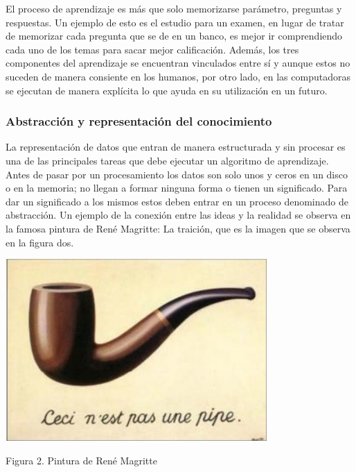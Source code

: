 \documentclass[
  letterpaper,
  DIV=11,
  numbers=noendperiod]{scrartcl}
\begin{document}
El proceso de aprendizaje es más que solo memorizarse parámetro,
preguntas y respuestas. Un ejemplo de esto es el estudio para un examen,
en lugar de tratar de memorizar cada pregunta que se de en un banco, es
mejor ir comprendiendo cada uno de los temas para sacar mejor
calificación. Además, los tres componentes del aprendizaje se encuentran
vinculados entre sí y aunque estos no suceden de manera consiente en los
humanos, por otro lado, en las computadoras se ejecutan de manera
explícita lo que ayuda en su utilización en un futuro.

\hypertarget{abstracciuxf3n-y-representaciuxf3n-del-conocimiento}{%
\subsubsection{Abstracción y representación del
conocimiento}\label{abstracciuxf3n-y-representaciuxf3n-del-conocimiento}}

La representación de datos que entran de manera estructurada y sin
procesar es una de las principales tareas que debe ejecutar un algoritmo
de aprendizaje. Antes de pasar por un procesamiento los datos son solo
unos y ceros en un disco o en la memoria; no llegan a formar ninguna
forma o tienen un significado. Para dar un significado a los mismos
estos deben entrar en un proceso denominado de abstracción. Un ejemplo
de la conexión entre las ideas y la realidad se observa en la famosa
pintura de René Magritte: La traición, que es la imagen que se observa
en la figura dos.

\begin{Figura 2. Pintura de René Magritte}

{\centering \includegraphics{cap2.png}

}

\caption{Figura 2. Pintura de René Magritte}

\end{Figura 2. Pintura de René Magritte}
\end{document}
